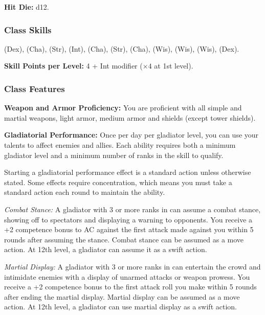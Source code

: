 \textbf{Hit Die:} d12.

\subsubsection{Class Skills}
 (Dex),  (Cha),  (Str),  (Int),  (Cha),  (Str),  (Cha),  (Wis),  (Wis),  (Wis),  (Dex).

\textbf{Skill Points per Level:} 4 + Int modifier ($\times4$ at 1st level).

\subsubsection{Class Features}

\textbf{Weapon and Armor Proficiency:} You are proficient with all simple and martial weapons, light armor, medium armor and shields (except tower shields).

\textbf{Gladiatorial Performance:} Once per day per gladiator level, you can use your talents to affect enemies and allies. Each ability requires both a minimum gladiator level and a minimum number of ranks in the  skill to qualify.

Starting a gladiatorial performance effect is a standard action unless otherwise stated. Some effects require concentration, which means you must take a standard action each round to maintain the ability.

\textit{Combat Stance:} A gladiator with 3 or more ranks in  can assume a combat stance, showing off to spectators and displaying a warning to opponents. You receive a +2 competence bonus to AC against the first attack made against you within 5 rounds after assuming the stance. Combat stance can be assumed as a move action. At 12th level, a gladiator can assume it as a swift action.

\textit{Martial Display:} A gladiator with 3 or more ranks in  can entertain the crowd and intimidate enemies with a display of unarmed attacks or weapon prowess. You receive a +2 competence bonus to the first attack roll you make within 5 rounds after ending the martial display. Martial display can be assumed as a move action. At 12th level, a gladiator can use martial display as a swift action.

